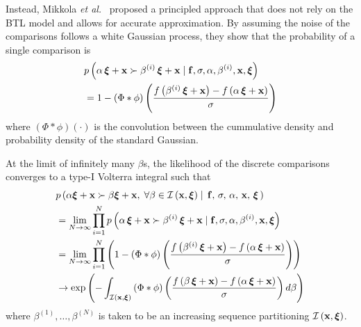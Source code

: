 Instead, Mikkola \textit{et al.}~\cite{pmlr-v119-mikkola20a} proposed a principled approach that does not rely on the BTL model and allows for accurate approximation.
By assuming the noise of the comparisons follows a white Gaussian process, they show that the probability of a single comparison is
\begin{align}
  &p\left(\alpha \, \bm{\xi} + \mathbf{x} \succ \beta^{(i)} \, \bm{\xi} + \mathbf{x} \mid \mathbf{f}, \sigma, \alpha, \beta^{(i)}, \mathbf{x}, \bm{\xi} \right) \nonumber \\
  &= 1 - \left(\Phi * \phi \right)\left( \frac{ f\left(\beta^{(i)} \, \bm{\xi} + \mathbf{x} \right) - f\left(\alpha \, \bm{\xi} + \mathbf{x} \right) }{\sigma} \right)
\end{align}
{\noindent}where \(\left(\Phi*\phi\right)\left(\cdot\right)\) is the convolution between the cummulative density and probability density of the standard Gaussian. 

At the limit of infinitely many \(\beta\)s, the likelihood of the discrete comparisons converges to a type-I Volterra integral such that
{\small
\begin{align}
  &p\left(\alpha \bm{\xi} + \mathbf{x} \succ \beta \bm{\xi} + \mathbf{x},\; \forall \beta \in \mathcal{I}\left(\mathbf{x}, \bm{\xi}\right) \mid\, \mathbf{f},\, \sigma,\, \alpha,\, \mathbf{x},\, \bm{\xi}\,\right)  \nonumber \\
  &= \lim_{N \rightarrow \infty} \prod^{N}_{i=1} p\left(\alpha \, \bm{\xi} + \mathbf{x} \succ \beta^{(i)} \, \bm{\xi} + \mathbf{x} \mid \mathbf{f}, \sigma, \alpha, \beta^{(i)}, \mathbf{x}, \bm{\xi} \right) \nonumber\\
  &= \lim_{N \rightarrow \infty} \prod^{N}_{i=1} \left(  1 - \left(\Phi * \phi \right)\left( \frac{ f\left(\beta^{(i)} \, \bm{\xi} + \mathbf{x} \right) - f\left(\alpha \, \bm{\xi} + \mathbf{x} \right) }{\sigma} \right) \right) \nonumber\\
  &\rightarrow \exp\left(  - \int_{\mathcal{I}\left(\mathbf{x}, \bm{\xi}\right)} \left(\Phi * \phi \right) \left( \frac{ f\left(\beta \, \bm{\xi} + \mathbf{x} \right) - f\left(\alpha \, \bm{\xi} + \mathbf{x} \right) }{\sigma} \right) d\beta \right)
\end{align}
}%
%
{\noindent}where \(\beta^{(1)}, \ldots, \beta^{(N)}\) is taken to be an increasing sequence partitioning \(\mathcal{I\left(\mathbf{x}, \bm{\xi}\right)}\).

